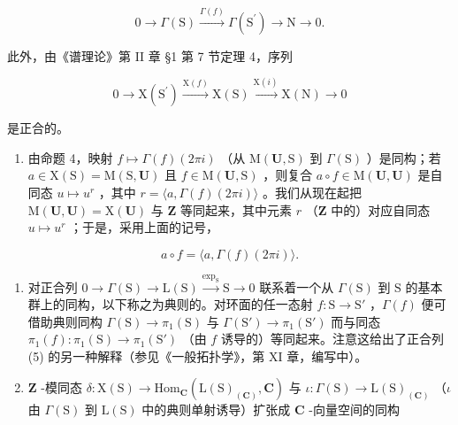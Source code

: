 \[
0 \longrightarrow \Gamma (\mathrm{S}) \stackrel {\Gamma (f)} {\longrightarrow} \Gamma (\mathrm{S} ^ {\prime}) \longrightarrow \mathrm{N} \longrightarrow 0.\tag{5}
\]

此外，由《谱理论》第 II 章 §1 第 7 节定理 4，序列

\[
0 \longrightarrow \mathrm{X} (\mathrm{S} ^ {\prime}) \stackrel {{\mathrm{X} (f)}} {{\longrightarrow}} \mathrm{X} (\mathrm{S}) \stackrel {{\mathrm{X} (i)}} {{\longrightarrow}} \mathrm{X} (\mathrm{N}) \longrightarrow 0\tag{6}
\]

是正合的。

\begin{enumerate}
\def\labelenumi{\arabic{enumi})}
\setcounter{enumi}{1}
\tightlist
\item
  由命题 4，映射 \(f \mapsto \Gamma(f)(2\pi i)\) （从 \(\mathrm{M}(\mathbf{U},\mathrm{S})\) 到 \(\Gamma(\mathrm{S})\) ）是同构；若 \(a \in \mathrm{X}(\mathrm{S}) = \mathrm{M}(\mathrm{S},\mathbf{U})\) 且 \(f \in \mathrm{M}(\mathbf{U},\mathrm{S})\) ，则复合 \(a \circ f \in \mathrm{M}(\mathbf{U},\mathbf{U})\) 是自同态 \(u \mapsto u^r\) ，其中 \(r = \langle a,\Gamma(f)(2\pi i)\rangle\) 。我们从现在起把 \(\mathrm{M}(\mathbf{U},\mathbf{U}) = \mathrm{X}(\mathbf{U})\) 与 \(\mathbf{Z}\) 等同起来，其中元素 \(r\) （\(\mathbf{Z}\) 中的）对应自同态 \(u \mapsto u^r\) ；于是，采用上面的记号，
\end{enumerate}

\[
a \circ f = \langle a, \Gamma (f) (2 \pi i) \rangle .
\]

\begin{enumerate}
\def\labelenumi{\arabic{enumi})}
\setcounter{enumi}{2}
\item
  对正合列 \(0 \to \Gamma(\mathrm{S}) \to \mathrm{L}(\mathrm{S}) \xrightarrow{\exp_{\mathrm{S}}} \mathrm{S} \to 0\) 联系着一个从 \(\Gamma(\mathrm{S})\) 到 \(\mathrm{S}\) 的基本群上的同构，以下称之为典则的。对环面的任一态射 \(f: \mathrm{S} \to \mathrm{S}'\) ，\(\Gamma(f)\) 便可借助典则同构 \(\Gamma(\mathrm{S}) \to \pi_1(\mathrm{S})\) 与 \(\Gamma(\mathrm{S}') \to \pi_1(\mathrm{S}')\) 而与同态 \(\pi_1(f): \pi_1(\mathrm{S}) \to \pi_1(\mathrm{S}')\) （由 \(f\) 诱导的）等同起来。注意这给出了正合列 (5) 的另一种解释（参见《一般拓扑学》，第 XI 章，编写中）。
\item
  \(\mathbf{Z}\) -模同态 \(\delta : \mathrm{X}(\mathrm{S}) \to \mathrm{Hom}_{\mathbf{C}}(\mathrm{L}(\mathrm{S})_{(\mathbf{C})}, \mathbf{C})\) 与 \(\iota : \Gamma(\mathrm{S}) \to \mathrm{L}(\mathrm{S})_{(\mathbf{C})}\) （\(\iota\) 由 \(\Gamma(\mathrm{S})\) 到 \(\mathrm{L}(\mathrm{S})\) 中的典则单射诱导）扩张成 \(\mathbf{C}\) -向量空间的同构
\end{enumerate}


